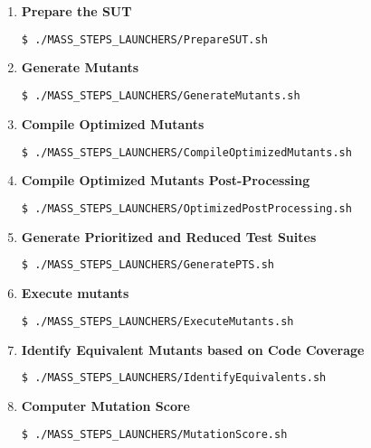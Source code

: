 \begin{enumerate}
	\item \textbf{Prepare the SUT}

	\begin{lstlisting}[language=bash]
	  $ ./MASS_STEPS_LAUNCHERS/PrepareSUT.sh
\end{lstlisting}

	\item \textbf{Generate Mutants}

	\begin{lstlisting}[language=bash]
	  $ ./MASS_STEPS_LAUNCHERS/GenerateMutants.sh
\end{lstlisting}

	\item \textbf{Compile Optimized Mutants}

	\begin{lstlisting}[language=bash]
	  $ ./MASS_STEPS_LAUNCHERS/CompileOptimizedMutants.sh
\end{lstlisting}

	\item \textbf{Compile Optimized Mutants Post-Processing}

	\begin{lstlisting}[language=bash]
	  $ ./MASS_STEPS_LAUNCHERS/OptimizedPostProcessing.sh
\end{lstlisting}

	\item \textbf{Generate Prioritized and Reduced Test Suites}

	\begin{lstlisting}[language=bash]
	  $ ./MASS_STEPS_LAUNCHERS/GeneratePTS.sh
\end{lstlisting}

	\item \textbf{Execute mutants}

	\begin{lstlisting}[language=bash]
	  $ ./MASS_STEPS_LAUNCHERS/ExecuteMutants.sh
\end{lstlisting}

	\item \textbf{Identify Equivalent Mutants based on Code Coverage}

	\begin{lstlisting}[language=bash]
	  $ ./MASS_STEPS_LAUNCHERS/IdentifyEquivalents.sh
\end{lstlisting}

	\item \textbf{Computer Mutation Score}

	\begin{lstlisting}[language=bash]
	  $ ./MASS_STEPS_LAUNCHERS/MutationScore.sh
\end{lstlisting} 
\end{enumerate}



